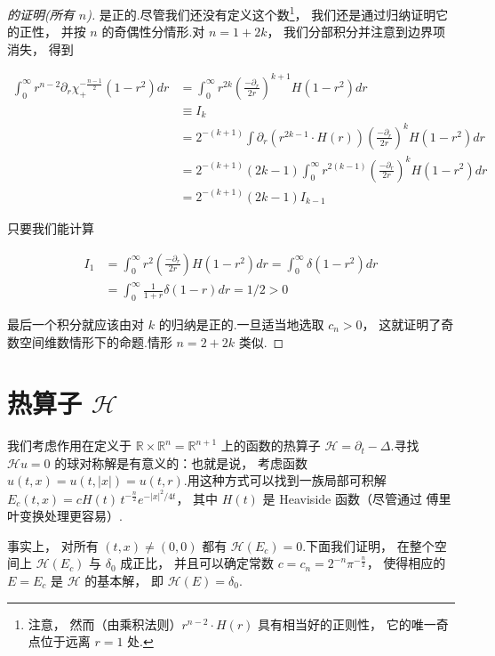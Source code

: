 \begin{proof}[ 的证明(所有 $n$)]
是正的.尽管我们还没有定义这个数\footnote{注意， 然而（由乘积法则）$r^{n-2} \cdot H(r)$ 具有相当好的正则性， 它的唯一奇点位于远离 $r = 1$ 处.}， 我们还是通过归纳证明它的正性， 并按 $n$ 的奇偶性分情形.对 $n = 1+2k$， 我们分部积分并注意到边界项消失， 得到

\[
\begin{aligned}
\int_{0}^{\infty}r^{n-2}\partial_{r}\chi_{+}^{-\frac{n-1}{2}}(1-r^{2})dr &= \int_{0}^{\infty}r^{2k}\left(\frac{-\partial_{r}}{2r}\right)^{k+1}H(1-r^{2})dr \\
&\equiv I_{k} \\
&= 2^{-(k+1)}\int\partial_{r}\left(r^{2k-1}\cdot H(r)\right)\left(\frac{-\partial_{r}}{2r}\right)^{k}H(1-r^{2})dr \\
&= 2^{-(k+1)}(2k-1)\int_{0}^{\infty}r^{2(k-1)}\left(\frac{-\partial_{r}}{2r}\right)^{k}H(1-r^{2})dr \\
&= 2^{-(k+1)}(2k-1)I_{k-1}
\end{aligned}
\]

只要我们能计算

\[
\begin{aligned}
I_{1} &= \int_{0}^{\infty}r^{2}\left(\frac{-\partial_{r}}{2r}\right)H(1-r^{2})dr = \int_{0}^{\infty}\delta(1-r^{2})dr \\
&= \int_{0}^{\infty}\frac{1}{1+r}\delta(1-r)dr = 1/2 > 0
\end{aligned}
\]

最后一个积分就应该由对 $k$ 的归纳是正的.一旦适当地选取 $c_{n} > 0$， 这就证明了奇数空间维数情形下的命题.情形 $n = 2+2k$ 类似.
\end{proof}
\section{热算子 \texorpdfstring{$\mathcal{H}$}{H}}

我们考虑作用在定义于 $\mathbb{R} \times \mathbb{R}^{n} = \mathbb{R}^{n+1}$ 上的函数的热算子 $\mathcal{H} = \partial_{t} - \Delta$.寻找 $\mathcal{H}u = 0$ 的球对称解是有意义的：也就是说， 考虑函数 $u(t, x) = u(t, |x|) = u(t, r)$.用这种方式可以找到一族局部可积解 $E_{c}(t, x) = cH(t)\, t^{-\frac{n}{2}}e^{-|x|^{2}/4t}$， 其中 $H(t)$ 是 Heaviside 函数（尽管通过 傅里叶变换处理更容易）.

事实上， 对所有 $(t, x) \neq (0, 0)$ 都有 $\mathcal{H}(E_{c}) = 0$.下面我们证明， 在整个空间上 $\mathcal{H}(E_{c})$ 与 $\delta_{0}$ 成正比， 并且可以确定常数 $c = c_{n} = 2^{-n}\pi^{-\frac{n}{2}}$， 使得相应的 $E = E_{c}$ 是 $\mathcal{H}$ 的基本解， 即 $\mathcal{H}(E) = \delta_{0}$.

